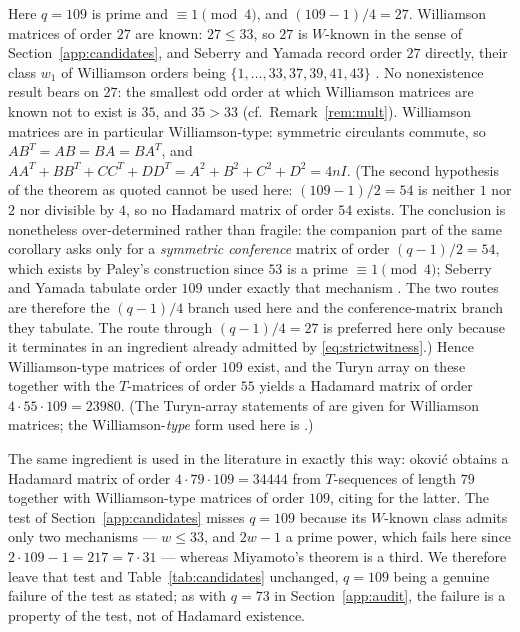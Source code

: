 \documentclass[11pt]{article}
\begin{document}
Here \(q=109\) is prime and \(\equiv1\pmod 4\), and \((109-1)/4=27\).
Williamson matrices of order \(27\) are known: \(27\le33\), so \(27\) is
\(W\)-known in the sense of Section~\ref{app:candidates}, and Seberry and
Yamada record order \(27\) directly, their class \(w_{1}\) of Williamson
orders being \(\{1,\dots,33,37,39,41,43\}\)
\cite[Table~A.1 and legend, pp.~541--543]{SeberryYamada1992}.  No
nonexistence result bears on \(27\): the smallest odd order at which
Williamson matrices are known not to exist is \(35\), and \(35>33\)
(cf.\ Remark~\ref{rem:mult}).  Williamson
matrices are in particular Williamson-type: symmetric circulants
commute, so \(AB^{T}=AB=BA=BA^{T}\), and
\(AA^{T}+BB^{T}+CC^{T}+DD^{T}=A^{2}+B^{2}+C^{2}+D^{2}=4nI\).  (The
second hypothesis of the theorem as quoted cannot be used here:
\((109-1)/2=54\) is neither \(1\) nor \(2\) nor divisible by \(4\), so
no Hadamard matrix of order \(54\) exists.  The conclusion is
nonetheless over-determined rather than fragile: the companion part of
the same corollary \cite[Cor.~8.8(2), p.~505]{SeberryYamada1992} asks
only for a \emph{symmetric conference} matrix of order
\((q-1)/2=54\), which exists by Paley's construction since \(53\) is a
prime \(\equiv1\pmod4\); Seberry and Yamada tabulate order \(109\) under
exactly that mechanism \cite[Table~A.1, p.~543]{SeberryYamada1992}.  The
two routes are therefore the \((q-1)/4\) branch used here and the
conference-matrix branch they tabulate.  The route through
\((q-1)/4=27\) is preferred here only because it terminates in an
ingredient already admitted by \eqref{eq:strictwitness}.)  Hence
Williamson-type matrices of order
\(109\) exist, and the Turyn array on these together with the
\(T\)-matrices of order \(55\)
\cite{Turyn1974,SeberryYamada1992,SeberryYamada2020,CatiPasechnik2024}
yields a Hadamard matrix of order \(4\cdot55\cdot109=23980\).  (The
Turyn-array statements of \cite{SeberryYamada1992} are given for
Williamson matrices; the Williamson-\emph{type} form used here is
\cite[Thm.~5]{CatiPasechnik2024}.)

The same ingredient is used in the literature in exactly this way:
\DJ okovi\'c \cite[Prop.~3.4]{Djokovic2011} obtains a Hadamard matrix
of order \(4\cdot79\cdot109=34444\) from \(T\)-sequences of length
\(79\) together with Williamson-type matrices of order \(109\), citing
\cite{SeberryYamada1992} for the latter.  The test of
Section~\ref{app:candidates} misses \(q=109\) because its \(W\)-known class
admits only two mechanisms --- \(w\le33\), and \(2w-1\) a prime power,
which fails here since \(2\cdot109-1=217=7\cdot31\) --- whereas
Miyamoto's theorem is a third.  We therefore leave that test and
Table~\ref{tab:candidates} unchanged, \(q=109\) being a genuine failure
of the test as stated; as with \(q=73\) in Section~\ref{app:audit}, the
failure is a property of the test, not of Hadamard existence.
\end{document}

